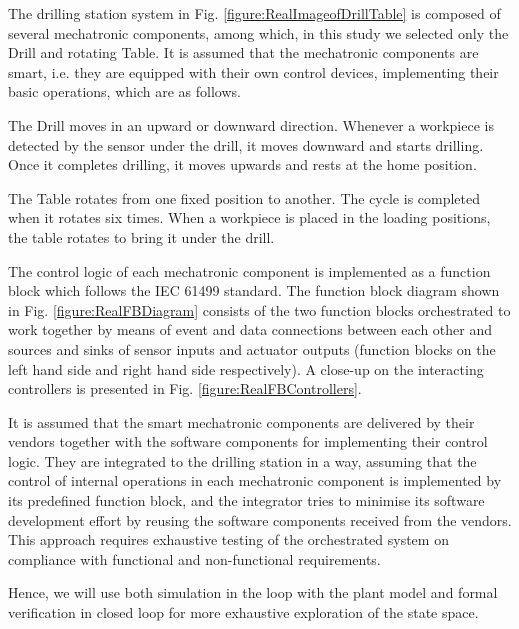 \begin{bibunit}

The drilling station system in Fig. \ref{figure:RealImageofDrillTable} is composed of several mechatronic components, among which, in this study we selected only the Drill and rotating Table. 
It is assumed that the mechatronic components are smart, i.e. they are equipped with their own control devices, implementing their basic operations, which are as follows. 

The Drill moves in an upward or downward direction. Whenever a workpiece is detected by the sensor under the drill, it moves downward and starts drilling. Once it completes drilling, it moves upwards and rests at the home position. 

The Table rotates from one fixed position to another. The cycle is completed when it rotates six times. 
When a workpiece is placed in the loading positions, the table rotates to bring it under the drill.

The control logic of each mechatronic component is implemented as a function block which follows the IEC 61499 standard. The function block diagram  shown in Fig. \ref{figure:RealFBDiagram} consists of the two function blocks orchestrated to work together by means of event and data connections between each other and sources and sinks of sensor inputs and actuator outputs (function blocks on the left hand side and right hand side respectively). A close-up on the interacting controllers is presented in Fig. \ref{figure:RealFBControllers}.

It is assumed that the smart mechatronic components are delivered by their vendors together with the software components for implementing their control logic. They are integrated to the drilling station in a way, assuming that the control of internal operations in each mechatronic component is implemented by its predefined function block, and the integrator tries to minimise its software development effort by reusing the software components received from the vendors.
This approach requires exhaustive testing of the orchestrated system on compliance with functional and non-functional requirements. 

Hence, we will use both simulation in the loop with the plant model and formal verification in closed loop for more exhaustive exploration of the state space. 




\end{bibunit}

